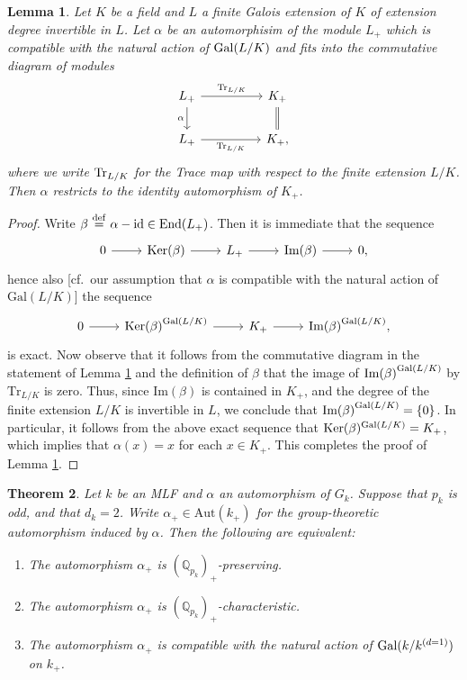 \documentclass[11pt,showkeys]{article}
\theoremstyle{theorem}
\newtheorem{theorem}{Theorem}[section]
\newtheorem{lem}[theorem]{Lemma}
\theoremstyle{definition}
\def\bQ{{\mathbb Q}}
\def\Ker{{\mbox{Ker}}}
\def\Im{{\mbox{Im}}}
\def\End{{\mbox{End}}}
\def\defeq{ \ {\stackrel{\mathrm{def}}{=}} \ }
\begin{document}
\begin{lem}\label{lemma:2.3}
Let $K$ be a field and $L$ a finite Galois extension of $K$ of extension degree invertible in $L$. Let $\alpha$ be an automorphisim of the module $L_+$ which is compatible with the natural action of ${\rm Gal} (L/K)$ and fits into the commutative diagram of modules 
\[
\begin{tikzcd}
L_{+} \arrow[rr, "{\rm Tr}_{L/K}"] \arrow[d, "\alpha"'] && K_+ \arrow[d, equal] \\
L_{+} \arrow[rr, "{\rm Tr}_{L/K}"']                         && K_+,                
\end{tikzcd}
\]
where we write ${\rm Tr}_{L/K}$ for the Trace map with respect to the finite extension $L/K$. 
Then $\alpha$ restricts to the identity automorphism of $K_+$.  
\end{lem}
\begin{proof}
Write $\beta \defeq \alpha - {\rm id} \in \End(L_+)$. Then it is immediate that the sequence 
\[
\begin{tikzcd}
0 \arrow[r] & \mbox{Ker}(\beta) \arrow[r] & L_{+} \arrow[r] & \mbox{Im}(\beta) \arrow[r] & 0, 
\end{tikzcd}
\]
hence also [cf.\ our assumption that $\alpha$ is compatible with the natural action of $\mathrm{Gal}(L / K)$] the sequence 
\[
\begin{tikzcd}
0 \arrow[r] & {\mbox{Ker}(\beta)}^{{\rm Gal}(L/K)} \arrow[r] & K_+ \arrow[r] & {\mbox{Im}(\beta)}^{{\rm Gal}(L/K)}, 
\end{tikzcd}
\]
is exact. 
Now observe that it follows from the commutative diagram in the statement of Lemma \ref{lemma:2.3} and the definition of $\beta$ that the image of ${\Im(\beta)}^{{\rm Gal}(L/K)}$ by $\mathrm{Tr}_{L / K}$ is zero. Thus, since $\mbox{Im}(\beta)$ is contained in $K_+$, and the degree of the finite extension $L / K$ is invertible in $L$, we conclude that ${\mbox{Im}(\beta)}^{{\rm Gal}(L/K)} = \{0\}$.  In particular, it follows from the above exact sequence that $\Ker(\beta)^{{\rm Gal}(L/K)} = K_{+}$, which implies that $\alpha(x) = x$ for each $x \in K_+$. This completes the proof of Lemma \ref{lemma:2.3}.  
\end{proof}

\begin{theorem}\label{theorem:2.4}
Let $k$ be an MLF and $\alpha$ an automorphism of $G_k$. Suppose that $p_k$ is odd, and that $d_k = 2$. Write $\alpha_+ \in \mathrm{Aut}(k_+)$ for the group-theoretic automorphism induced by $\alpha$. Then the following are equivalent: 
   \begin{enumerate}[label=(\arabic*),ref=(\arabic*)]
   	\item[\rm (1)] The automorphism $\alpha_+$ is $(\bQ_{p_k})_+$-preserving. \label{theorem:2.4:statement:1}
   	\item[\rm (2)] The automorphism $\alpha_+$ is $(\bQ_{p_k})_+$-characteristic. \label{theorem:2.4:statement:2}
   	\item[\rm (3)] The automorphism $\alpha_{+}$ is compatible with the natural action of ${\rm Gal} (k/k^{(d=1)})$ on $k_{+}$. \label{theorem:2.4:statement:3}
   \end{enumerate}

\end{theorem}
\end{document}
